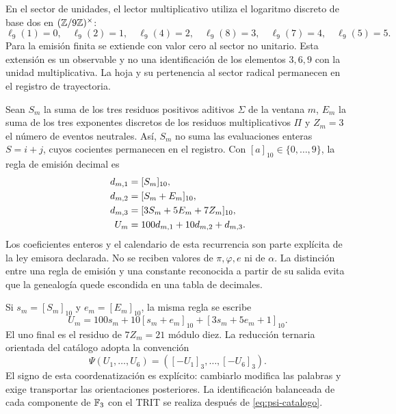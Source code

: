 En el sector de unidades, el lector multiplicativo utiliza el logaritmo discreto de base dos en \((\mathbb Z/9\mathbb Z)^\times\):
\[
 \ell_9(1)=0,\quad\ell_9(2)=1,\quad\ell_9(4)=2,\quad
 \ell_9(8)=3,\quad\ell_9(7)=4,\quad\ell_9(5)=5.
\]
Para la emisión finita se extiende con valor cero al sector no unitario. Esta extensión es un observable y no una identificación de los elementos \(3,6,9\) con la unidad multiplicativa. La hoja y su pertenencia al sector radical permanecen en el registro de trayectoria.

Sean \(S_m\) la suma de los tres residuos positivos aditivos \(\Sigma\) de la ventana \(m\), \(E_m\) la suma de los tres exponentes discretos de los residuos multiplicativos \(\Pi\) y \(Z_m=3\) el número de eventos neutrales. Así, \(S_m\) no suma las evaluaciones enteras \(S=i+j\), cuyos cocientes permanecen en el registro. Con \([a]_{10}\in\{0,\ldots,9\}\), la regla de emisión decimal es
\begin{align}
 d_{m,1}&=[S_m]_{10},\notag\\
 d_{m,2}&=[S_m+E_m]_{10},\notag\\
 d_{m,3}&=[3S_m+5E_m+7Z_m]_{10},\notag\\
 U_m&=100d_{m,1}+10d_{m,2}+d_{m,3}.
 \label{eq:emisor-seis}
\end{align}
Los coeficientes enteros y el calendario de esta recurrencia son parte explícita de la ley emisora declarada. No se reciben valores de \(\pi,\varphi,e\) ni de \(\alpha\). La distinción entre una regla de emisión y una constante reconocida a partir de su salida evita que la genealogía quede escondida en una tabla de decimales.

Si \(s_m=[S_m]_{10}\) y \(e_m=[E_m]_{10}\), la misma regla se escribe
\begin{equation}
 U_m=100s_m+10[s_m+e_m]_{10}+[3s_m+5e_m+1]_{10}.
 \label{eq:acoplamiento}
\end{equation}
El uno final es el residuo de \(7Z_m=21\) módulo diez. La reducción ternaria orientada del catálogo adopta la convención
\begin{equation}
 \Psi(U_1,\ldots,U_6)=([-U_1]_3,\ldots,[-U_6]_3).
 \label{eq:psi-catalogo}
\end{equation}
El signo de esta coordenatización es explícito: cambiarlo modifica las palabras y exige transportar las orientaciones posteriores. La identificación balanceada de cada componente de \(\mathbb F_3\) con el TRIT se realiza después de \eqref{eq:psi-catalogo}.

